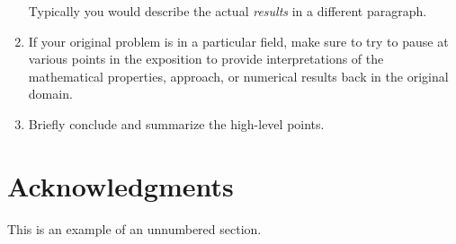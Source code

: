 \documentclass[12pt]{article}
\begin{document}
\begin{enumerate}
Typically you would describe the actual \emph{results} in a different paragraph.

\item If your original problem is in a particular field, make sure to try to
pause at various points in the exposition to provide interpretations of the
mathematical properties, approach, or numerical results back in the original
domain.

\item Briefly conclude and summarize the high-level points.
\end{enumerate}

\section*{Acknowledgments}

This is an example of an unnumbered section.

\newpage

\end{document}
